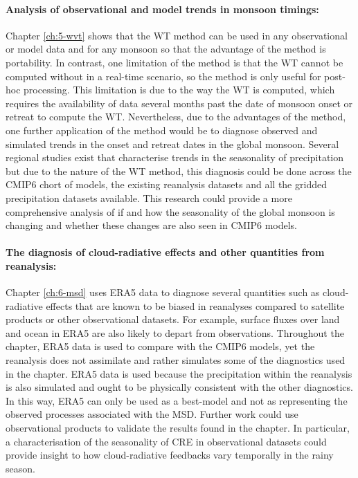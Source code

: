 \paragraph{Analysis of observational and model trends in monsoon timings:}
Chapter \ref{ch:5-wvt} shows that the WT method can be used in any observational or model data and for any monsoon so that the advantage of the method is portability.
In contrast, one limitation of the method is that the WT cannot be computed without in a real-time scenario, so the method is only useful for post-hoc processing. 
This limitation is due to the way the WT is computed, which requires the availability of data several months past the date of monsoon onset or retreat to compute the WT. 
Nevertheless, due to the advantages of the method, one further application of the method would be to diagnose observed and simulated trends in the onset and retreat dates in the global monsoon.
Several regional studies exist that characterise trends in the seasonality of precipitation but due to the nature of the WT method, this diagnosis could be done across the CMIP6 chort of models, the existing reanalysis datasets and all the gridded precipitation datasets available.  
This research could provide a more comprehensive analysis of if and how the seasonality of the global monsoon is changing and whether these changes are also seen in CMIP6 models.

\paragraph{The diagnosis of cloud-radiative effects and other quantities from reanalysis:}
Chapter \ref{ch:6-msd} uses ERA5 data to diagnose several quantities such as cloud-radiative effects that are known to be biased in reanalyses compared to satellite products or other observational datasets.
For example, surface fluxes over land and ocean in ERA5 are also likely to depart from observations.
Throughout the chapter, ERA5 data is used to compare with the CMIP6 models, yet the reanalysis does not assimilate and rather simulates some of the diagnostics used in the chapter.
ERA5 data is used because the precipitation within the reanalysis is also simulated and ought to be physically consistent with the other diagnostics. 
In this way, ERA5 can only be used as a best-model and not as representing the observed processes associated with the MSD.
Further work could use observational products to validate the results found in the chapter. 
In particular, a characterisation of the seasonality of CRE in observational datasets could provide insight to how cloud-radiative feedbacks vary temporally in the rainy season.  

